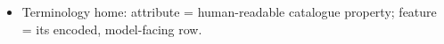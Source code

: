 \begin{itemize}
    \item Terminology home: attribute = human-readable catalogue property; feature = its encoded, model-facing row. 

\end{itemize}
